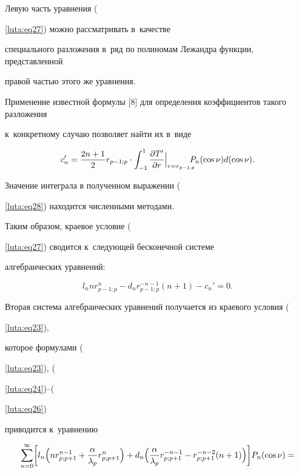 {{{{{{{{{{{{Левую часть уравнения ({\ref{luta:eq27}) можно рассматривать в~качестве

специального разложения в~ряд по полиномам Лежандра функции, представленной

правой частью этого же уравнения.

Применение известной формулы [8] для определения коэффициентов такого разложения

к~конкретному случаю позволяет найти их в~виде

\begin{equation}

\label{luta:eq28}

c_n '=\frac{2n+1}{2}r_{p-1; p} \cdot \int_{-1}^1 \frac{\partial T'}{\partial r}

\Bigl|_{r=r_{p-1; p} } \!\!\!\! P_n (\cos \nu )d(\cos \nu ).

\end{equation}

Значение интеграла в полученном выражении ({\ref{luta:eq28}) находится численными методами.

Таким образом, краевое условие ({\ref{luta:eq27}) сводится к~следующей бесконечной системе

алгебраических уравнений:

\begin{equation}

\label{luta:eq29}

l_n nr_{p-1; p}^n - d_n r_{p-1;p}^{-n-1} (n+1)-c_n '=0.

\end{equation}



Вторая система алгебраических уравнений получается из краевого условия ({\ref{luta:eq23}),

которое формулами ({\ref{luta:eq23}), ({\ref{luta:eq24})--({\ref{luta:eq26})

приводится к~уравнению

\begin{multline}

\sum\limits_{n=0}^\infty

\biggl[  l_n \Bigl(nr_{p; p+1}^{n-1} +\frac{\alpha}{\lambda _p } r_{p; p+1}^n\Bigr)+

d_n \Bigl( \frac{\alpha }{\lambda _p } r_{p; p+1}^{-n-1}-

r_{p; p+1}^{-n-2} (n+1) \Bigr) \biggr] P_n (\cos \nu ) =

\\


\end{multline}}}}}}}}}}}}}}}}}}}}
